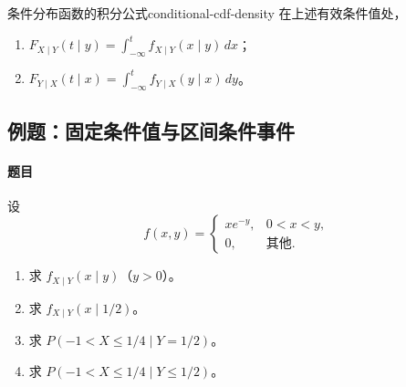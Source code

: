 \begin{mycorollary}{条件分布函数的积分公式}{conditional-cdf-density}
在上述有效条件值处，
\begin{enumerate}
\item $F_{X\mid Y}(t\mid y)=\displaystyle\int_{-\infty}^t
f_{X\mid Y}(x\mid y)\,dx$；
\item $F_{Y\mid X}(t\mid x)=\displaystyle\int_{-\infty}^t
f_{Y\mid X}(y\mid x)\,dy$。
\end{enumerate}
\end{mycorollary}

\subsection{例题：固定条件值与区间条件事件}\label{note:c3:e12}
\paragraph{题目}
设
\[
f(x,y)=
\begin{cases}
xe^{-y},&0<x<y,\\
0,&\text{其他}.
\end{cases}
\]
\begin{enumerate}
\item 求 $f_{X\mid Y}(x\mid y)$（$y>0$）。

\item 求 $f_{X\mid Y}(x\mid1/2)$。

\item 求 $P(-1<X\leq1/4\mid Y=1/2)$。

\item 求 $P(-1<X\leq1/4\mid Y\leq1/2)$。
\end{enumerate}

